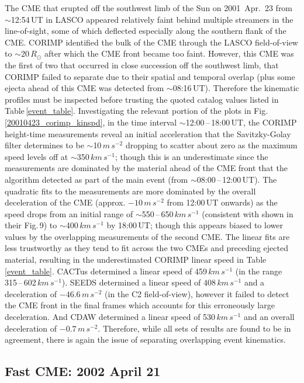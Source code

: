 \documentclass[referee,a4paper,12pt,traditabstract]{swsc}
\begin{document}
The CME that erupted off the southwest limb of the Sun on 2001~Apr.~23 from $\sim$12:54\,UT in LASCO appeared relatively faint behind multiple streamers in the line-of-sight, some of which deflected especially along the southern flank of the CME. CORIMP identified the bulk of the CME through the LASCO field-of-view to $\sim$20\,$R_\odot$ after which the CME front became too faint. However, this CME was the first of two that occurred in close succession off the southwest limb, that CORIMP failed to separate due to their spatial and temporal overlap (plus some ejecta ahead of this CME was detected from $\sim$08:16\,UT). Therefore the kinematic profiles must be inspected before trusting the quoted catalog values listed in Table\,\ref{event_table}. Investigating the relevant portion of the plots in Fig.\,\ref{20010423_corimp_kinspd}, in the time interval $\sim$12:00\,--\,18:00\,UT, the CORIMP height-time measurements reveal an initial acceleration that the Savitzky-Golay filter determines to be $\sim$10\,$m\,s^{-2}$ dropping to scatter about zero as the maximum speed levels off at $\sim$350\,$km\,s^{-1}$; though this is an underestimate since the measurements are dominated by the material ahead of the CME front that the algorithm detected as part of the main event (from $\sim$08:00\,--\,12:00\,UT). The quadratic fits to the measurements are more dominated by the overall deceleration of the CME (approx. $-10\,m\,s^{-2}$ from 12:00\,UT onwards) as the speed drops from an initial range of $\sim$550\,--\,650\,$km\,s^{-1}$ (consistent with \citealt{2009A&A...495..325B} shown in their Fig.\,9) to $\sim$400\,$km\,s^{-1}$ by 18:00\,UT; though this appears biased to lower values by the overlapping measurements of the second CME. The linear fits are less trustworthy as they tend to fit across the two CMEs and preceding ejected material, resulting in the underestimated CORIMP linear speed in Table\,\ref{event_table}. CACTus determined a linear speed of 459$\,km\,s^{-1}$ (in the range 315\,--\,602\,$km\,s^{-1}$). SEEDS determined a linear speed of 408$\,km\,s^{-1}$ and a deceleration of $-46.6\,m\,s^{-2}$ (in the C2 field-of-view), however it failed to detect the CME front in the final frames which accounts for this erroneously large deceleration. And CDAW determined a linear speed of 530$\,km\,s^{-1}$ and an overall deceleration of $-0.7\,m\,s^{-2}$. Therefore, while all sets of results are found to be in agreement, there is again the issue of separating overlapping event kinematics.



\subsection{Fast CME: 2002 April 21}
\label{sect_20020421}
\end{document}
